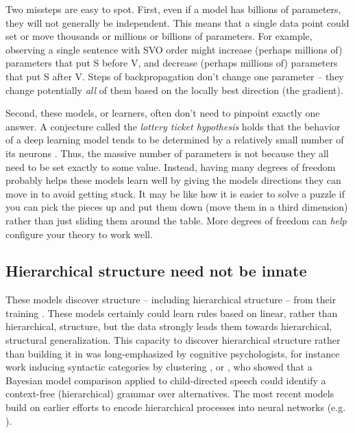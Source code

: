 \documentclass[output=paper,colorlinks,citecolor=brown
]{langscibook}
\begin{document}
Two missteps are easy to spot. First, even if a model has billions of parameters, they will not generally be independent. This means that a single data point could set or move thousands or millions or billions of parameters. For example, observing a single sentence with SVO order might increase (perhaps millions of) parameters that put S before V, and decrease (perhaps millions of) parameters that put S after V. Steps of backpropagation don't change one parameter -- they change potentially \textit{all} of them based on the locally best direction (the gradient). 

Second, these models, or learners, often don't need to pinpoint exactly one answer. A conjecture called the \textit{lottery ticket hypothesis} holds that the behavior of a deep learning model tends to be determined by a relatively small number of its neurons \citep{frankle2018lottery}. Thus, the massive number of parameters is not because they all need to be set exactly to some value. Instead, having many degrees of freedom probably helps these models learn well by giving the models directions they can move in to avoid getting stuck. It may be like how it is easier to solve a puzzle if you can pick the pieces up and put them down (move them in a third dimension) rather than just sliding them around the table. More degrees of freedom can \textit{help} configure your theory to work well. 

\subsection{Hierarchical structure need not be innate}

These models discover structure -- including hierarchical structure -- from their training \citep{hewitt2019structural,manning2020emergent,lin2019open,tenney2019you,warstadt2020can,kim2020pre,linzen2021syntactic,mahowald2023dissociating}. These models certainly could learn rules based on linear, rather than hierarchical, structure, but the data strongly leads them towards hierarchical, structural generalization. This capacity to discover hierarchical structure rather than building it in was long-emphasized by cognitive psychologists, for instance work inducing syntactic categories by clustering \citep{redington1998distributional,clark2000inducing}, or \citet{perfors2011learnability}, who showed that a Bayesian model comparison applied to child-directed speech could identify a context-free (hierarchical) grammar over alternatives.  The most recent models build on earlier efforts to encode hierarchical processes into neural networks (e.g. \citealt{tabor1997parsing,christiansen1999toward,tabor2000fractal,smolensky2006harmonic}).  
\end{document}
